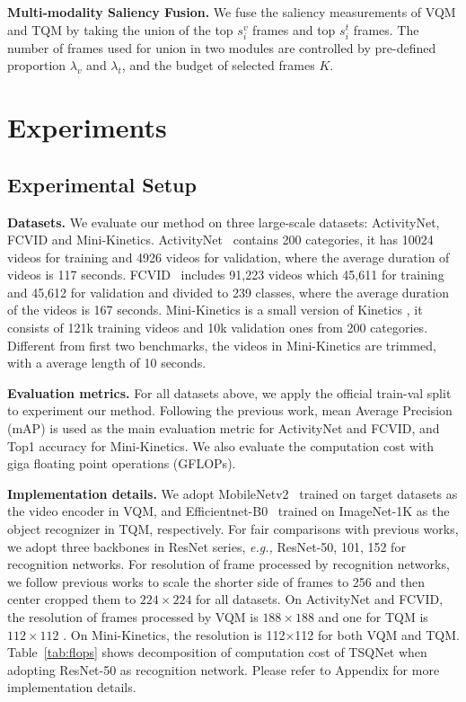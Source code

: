 \documentclass[runningheads]{llncs}
\newcommand{\tabref}[1]{Table~\ref{#1}}
\begin{document}
\noindent\textbf{Multi-modality Saliency Fusion.}
We fuse the saliency measurements of VQM and TQM by taking the union of the top $s_i^v$ frames and top $s_i^t$ frames. The number of frames used for union in two modules are controlled by pre-defined proportion $\lambda_v$ and $\lambda_t$, and the budget of selected frames $K$.

\section{Experiments}
\subsection{Experimental Setup}
\label{exp:setup}
\noindent \textbf{Datasets.}
We evaluate our method on three large-scale datasets: ActivityNet, FCVID and Mini-Kinetics.  
ActivityNet~\cite{caba2015activitynet} contains 200 categories, it has 10024 videos for training and 4926 videos for validation, where the average duration of videos is 117 seconds.
FCVID~\cite{fcvid} includes 91,223 videos which 45,611 for training and 45,612 for validation and divided to 239 classes, where the average duration of the videos is 167 seconds.
Mini-Kinetics is a small version of Kinetics \cite{kay2017kinetics}, it consists of 121k training videos and 10k validation ones from 200 categories. Different from first two benchmarks, the videos in Mini-Kinetics are trimmed, with a average length of 10 seconds.

\noindent \textbf{Evaluation metrics.}
For all datasets above, we apply the official train-val split to experiment our method.
Following the previous work, mean Average Precision (mAP) is used as the main evaluation metric for ActivityNet and FCVID, and Top1 accuracy for Mini-Kinetics. We also evaluate the computation cost with giga floating point operations (GFLOPs). 


\noindent \textbf{Implementation details.}
We adopt MobileNetv2~\cite{mobilenetv2} trained on target datasets as the video encoder in VQM, and Efficientnet-B0~\cite{efficientnet} trained on ImageNet-1K as the object recognizer in TQM, respectively. 
For fair comparisons with previous works, we adopt three backbones in ResNet \cite{resnet} series,  \emph{e.g.,} ResNet-50, 101, 152 for recognition networks. 
For resolution of frame processed by recognition networks, we follow previous works to scale the shorter side of frames to 256 and then center cropped them to $224\times224$ for all datasets. On ActivityNet and FCVID, the resolution of frames processed by VQM is $188\times188$ and one for TQM is $112\times112$ \footnotemark[1].
On Mini-Kinetics, the resolution is 112$\times$112 for both VQM and TQM.
\tabref{tab:flops} shows decomposition of computation cost of TSQNet when adopting ResNet-50 as recognition network. Please refer to Appendix for more implementation details.
\end{document}
